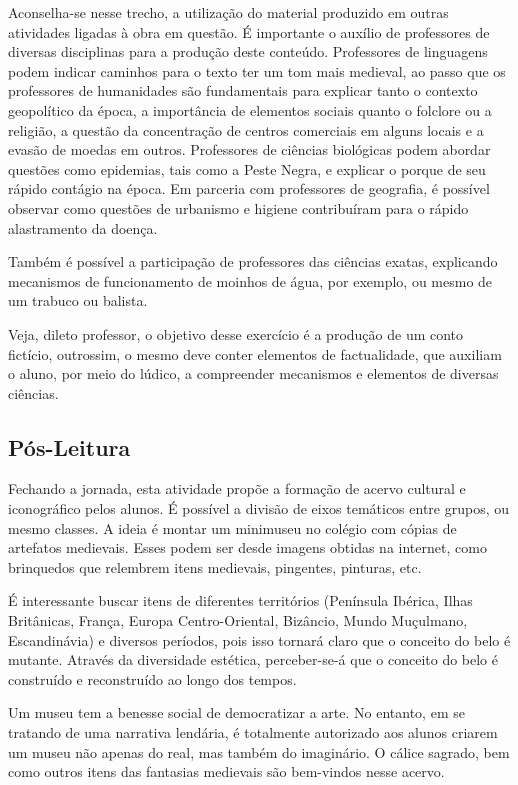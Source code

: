 \documentclass[12pt]{extarticle}
\begin{document}
Aconselha-se nesse trecho, a utilização do material produzido em outras
atividades ligadas à obra em questão. É importante o auxílio de
professores de diversas disciplinas para a produção deste conteúdo.
Professores de linguagens podem indicar caminhos para o texto ter um tom
mais medieval, ao passo que os professores de humanidades são
fundamentais para explicar tanto o contexto geopolítico da época, a
importância de elementos sociais quanto o folclore ou a religião, a
questão da concentração de centros comerciais em alguns locais e a
evasão de moedas em outros. Professores de ciências biológicas podem
abordar questões como epidemias, tais como a Peste Negra, e explicar o
porque de seu rápido contágio na época. Em parceria com professores de
geografia, é possível observar como questões de urbanismo e higiene
contribuíram para o rápido alastramento da doença.

Também é possível a participação de professores das ciências exatas,
explicando mecanismos de funcionamento de moinhos de água, por exemplo,
ou mesmo de um trabuco ou balista.

Veja, dileto professor, o objetivo desse exercício é a produção de um
conto fictício, outrossim, o mesmo deve conter elementos de
factualidade, que auxiliam o aluno, por meio do lúdico, a compreender
mecanismos e elementos de diversas ciências.

\subsection{Pós-Leitura}

Fechando a jornada, esta atividade propõe a formação de
acervo cultural e iconográfico pelos alunos. É possível a divisão de
eixos temáticos entre grupos, ou mesmo classes. A ideia é montar um
minimuseu no colégio com cópias de artefatos medievais. Esses podem ser
desde imagens obtidas na internet, como brinquedos que relembrem itens
medievais, pingentes, pinturas, etc.

É interessante buscar itens de diferentes territórios (Península
Ibérica, Ilhas Britânicas, França, Europa Centro-Oriental, Bizâncio,
Mundo Muçulmano, Escandinávia) e diversos períodos, pois isso tornará
claro que o conceito do belo é mutante. Através da diversidade estética,
perceber-se-á que o conceito do belo é construído e reconstruído ao
longo dos tempos.

Um museu tem a benesse social de democratizar a arte. No entanto, em se
tratando de uma narrativa lendária, é totalmente autorizado aos alunos
criarem um museu não apenas do real, mas também do imaginário. O cálice
sagrado, bem como outros itens das fantasias medievais são bem-vindos
nesse acervo.
\end{document}

